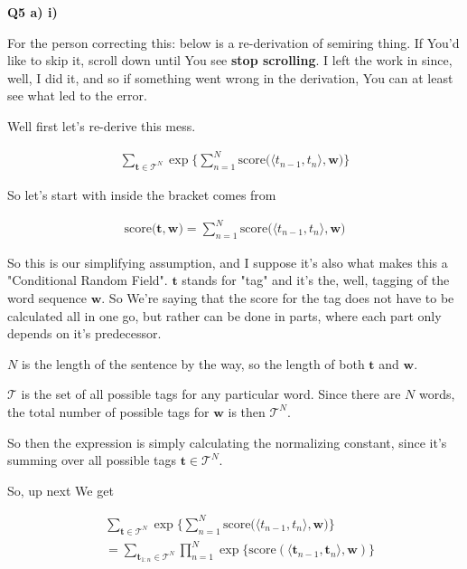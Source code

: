 \documentclass{article}
\begin{document}
	
\newpage

\textbf{Q5 a) i)}

	For the person correcting this: below is a re-derivation of semiring thing. If You'd like to skip it, scroll down until You see \textbf{stop scrolling}. I left the work in since, well, I did it, and so if something went wrong in the derivation, You can at least see what led to the error.

	Well first let's re-derive this mess.
	
	\begin{align}
		\sum_{\mathbf{t}\in\mathcal{T}^N} \exp\bigg\{ \sum^N_{n=1} \text{score}\big( \langle t_{n-1}, t_n \rangle, \mathbf{w} \big) \bigg\}
	\end{align}	
	
	So let's start with inside the bracket comes from
	
	\begin{align}
		\text{score}\big(\mathbf{t}, \mathbf{w} \big) = \sum^N_{n=1} \text{score}\big( \langle t_{n-1}, t_n \rangle, \mathbf{w} \big)
	\end{align}
	
	So this is our simplifying assumption, and I suppose it's also what makes this a "Conditional Random Field". $\mathbf{t}$ stands for "tag" and it's the, well, tagging of the word sequence $\mathbf{w}$. So We're saying that the score for  the tag does not have to be calculated all in one go, but rather can be done in parts, where each part only depends on it's predecessor. 
	
	$N$ is the length of the sentence by the way, so the length of both $\mathbf{t}$ and $\mathbf{w}$. 
	
	$\mathcal{T}$ is the set of all possible tags for any particular word. Since there are $N$ words, the total number of possible tags for $\mathbf{w}$ is then $\mathcal{T}^N$.
	
	So then the expression is simply calculating the normalizing constant, since it's summing over all possible tags $\mathbf{t}\in\mathcal{T}^N$.
	
	So, up next We get
	
	\begin{align}
		&\sum_{\mathbf{t}\in\mathcal{T}^N} \exp\bigg\{ \sum^N_{n=1} \text{score}\big( \langle t_{n-1}, t_n \rangle, \mathbf{w} \big) \bigg\}\\
		&= \sum_{\mathbf{t}_{1:n}\in\mathcal{T}^N} \prod^N_{n=1} \exp \big\{ \text{score}(\langle \mathbf{t}_{n-1}, \mathbf{t}_n \rangle, \mathbf{w}) \big\}
	\end{align}	
	
\end{document}
